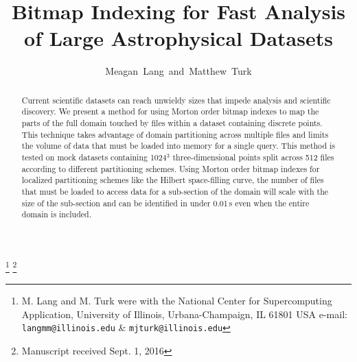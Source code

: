 \documentclass[apjl]{emulateapj}
\begin{document}

\title{Bitmap Indexing for Fast Analysis of Large Astrophysical Datasets}

\author{Meagan~Lang~and~Matthew~Turk}
\thanks{M. Lang and M. Turk were with the National Center for Supercomputing Application, University of Illinois, Urbana-Champaign, IL 61801 USA e-mail: {\tt langmm@illinois.edu} \& {\tt mjturk@illinois.edu}}
\thanks{Manuscript received Sept. 1, 2016}



\maketitle

\begin{abstract}
Current scientific datasets can reach unwieldy sizes that impede analysis and scientific discovery. We present a method for using Morton order bitmap indexes to map the parts of the full domain touched by files within a dataset containing discrete points. This technique takes advantage of domain partitioning across multiple files and limits the volume of data that must be loaded into memory for a single query. This method is tested on mock datasets containing 1024$^3$ three-dimensional points split across 512 files according to different partitioning schemes. Using Morton order bitmap indexes for localized partitioning schemes like the Hilbert space-filling curve, the number of files that must be loaded to access data for a sub-section of the domain will scale with the size of the sub-section and can be identified in under 0.01\,s even when the entire domain is included. 
\end{abstract}


\IEEEpeerreviewmaketitle
\end{document}
